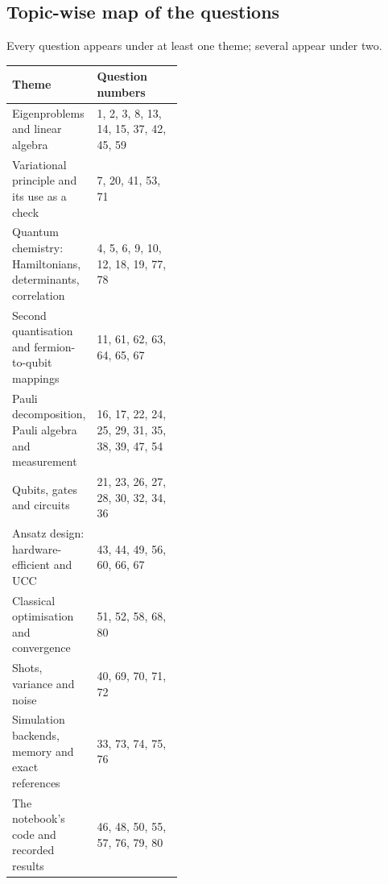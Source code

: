 \documentclass[11pt,a4paper]{article}
\begin{document}
\subsection*{Topic-wise map of the questions}\label{topicmap}
{\small Every question appears under at least one theme; several appear under two.\par}
{\small\renewcommand{\arraystretch}{1.2}
\begin{tabularx}{\linewidth}{@{}>{\raggedright\arraybackslash}p{0.42\linewidth}L@{}}
\toprule
\textbf{Theme} & \textbf{Question numbers}\\ \midrule
Eigenproblems and linear algebra & 1, 2, 3, 8, 13, 14, 15, 37, 42, 45, 59 \\
Variational principle and its use as a check & 7, 20, 41, 53, 71 \\
Quantum chemistry: Hamiltonians, determinants, correlation & 4, 5, 6, 9, 10, 12, 18, 19, 77, 78 \\
Second quantisation and fermion-to-qubit mappings & 11, 61, 62, 63, 64, 65, 67 \\
Pauli decomposition, Pauli algebra and measurement & 16, 17, 22, 24, 25, 29, 31, 35, 38, 39, 47, 54 \\
Qubits, gates and circuits & 21, 23, 26, 27, 28, 30, 32, 34, 36 \\
Ansatz design: hardware-efficient and UCC & 43, 44, 49, 56, 60, 66, 67 \\
Classical optimisation and convergence & 51, 52, 58, 68, 80 \\
Shots, variance and noise & 40, 69, 70, 71, 72 \\
Simulation backends, memory and exact references & 33, 73, 74, 75, 76 \\
The notebook's code and recorded results & 46, 48, 50, 55, 57, 76, 79, 80 \\
\bottomrule
\end{tabularx}}
\end{document}

